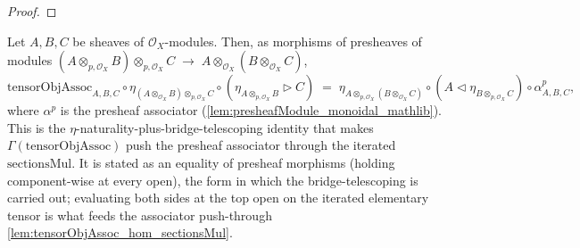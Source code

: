 \begin{proof}\leanok\end{proof}

\begin{lemma}

  \label{lem:tensorObjAssoc_eta_factor}
  Let \(A, B, C\) be sheaves of \(\mathcal{O}_X\)-modules. Then, as morphisms of
  presheaves of modules
  \((A \otimes_{p,\mathcal{O}_X} B) \otimes_{p,\mathcal{O}_X} C
    \;\longrightarrow\; A \otimes_{\mathcal{O}_X} (B \otimes_{\mathcal{O}_X} C)\),
  \[
    \mathrm{tensorObjAssoc}_{A,B,C}
      \circ \eta_{(A \otimes_{\mathcal{O}_X} B) \otimes_{p,\mathcal{O}_X} C}
      \circ (\eta_{A \otimes_{p,\mathcal{O}_X} B} \rhd C)
    \;=\;
    \eta_{A \otimes_{p,\mathcal{O}_X} (B \otimes_{\mathcal{O}_X} C)}
      \circ (A \lhd \eta_{B \otimes_{p,\mathcal{O}_X} C})
      \circ \alpha^{p}_{A,B,C},
  \]
  where \(\alpha^{p}\) is the presheaf associator
  (\cref{lem:presheafModule_monoidal_mathlib}). This is the
  \(\eta\)-naturality-plus-bridge-telescoping identity that makes
  \(\Gamma(\mathrm{tensorObjAssoc})\) push the presheaf associator through the
  iterated \(\mathrm{sectionsMul}\). It is stated as an equality of presheaf
  morphisms (holding component-wise at every open), the form in which the
  bridge-telescoping is carried out; evaluating both sides at the top open on the
  iterated elementary tensor is what feeds the associator push-through
  \cref{lem:tensorObjAssoc_hom_sectionsMul}.
\end{lemma}

